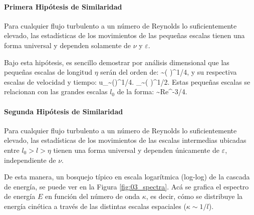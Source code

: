\paragraph{Primera Hipótesis de Similaridad} Para cualquier flujo turbulento a un número de Reynolds lo suficientemente elevado, las estadísticas de los movimientos de las pequeñas escalas tienen una forma universal y dependen solamente de $\nu$ y $\varepsilon$.

Bajo esta hipótesis, es sencillo demostrar  por análisis dimensional que las pequeñas escalas de longitud $\eta$ serán del orden de:
\be \eta \sim \left( \right)^{1/4}, \ee
y su respectiva escalas de velocidad y tiempo:
\be u_\eta \sim (\varepsilon \nu)^{1/4}. \ee
\be \tau_\eta \sim \left( \frac{\nu}{\varepsilon}\right)^{1/2}.  \ee
Estas pequeñas escalas se relacionan con las grandes escalas $l_0$ de la forma:
\be {}\sim Re^{-3/4}. \ee

\paragraph{Segunda Hipótesis de Similaridad} Para cualquier flujo turbulento a un número de Reynolds lo suficientemente elevado, las estadísticas de los movimientos de las escalas intermedias ubicadas entre $l_0>l>\eta$ tienen una forma universal y dependen únicamente de $\varepsilon$, independiente de $\nu$.

De esta manera, un bosquejo típico en escala logarítmica (log-log) de la cascada de energía, se puede ver en la Figura \ref{fig:03_spectra}. Acá se grafica el espectro de energía $E$ en función del número de onda $\kappa$, es decir, cómo se distribuye la energía cinética a través de las distintas escalas espaciales ($\kappa\sim 1/l$).


